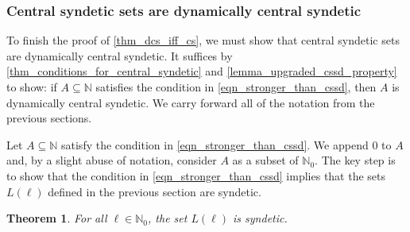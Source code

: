\documentclass[letter,11pt]{article}
\theoremstyle{plain}
\newtheorem{theorem}{Theorem}
\theoremstyle{definition}
\theoremstyle{plain}
\theoremstyle{plain}
\numberwithin{equation}{section}
\newcommand{\N}{\mathbb{N}}
\begin{document}
\subsubsection{Central syndetic sets are dynamically central syndetic}
\label{sec_proof_that_member_of_synd_idem_filter_is_dcsyndetic}

To finish the proof of \cref{thm_dcs_iff_cs}, we must show that central syndetic sets are dynamically central syndetic.  It suffices by \cref{thm_conditions_for_central_syndetic} and \cref{lemma_upgraded_cssd_property} to show: if $A \subseteq \N$ satisfies the condition in \eqref{eqn_stronger_than_cssd}, then $A$ is dynamically central syndetic. We carry forward all of the notation from the previous sections.

Let $A \subseteq \N$ satisfy the condition in \eqref{eqn_stronger_than_cssd}.  We append $0$ to $A$ and, by a slight abuse of notation, consider $A$ as a subset of $\N_0$.  The key step is to show that the condition in \eqref{eqn_stronger_than_cssd} implies that the sets $L(\ell)$ defined in the previous section are syndetic.


\begin{theorem}
\label{prop_long_punch_times_are_syndetic}
    For all $\ell \in \N_0$, the set $L(\ell)$ is syndetic.
\end{theorem}
\end{document}
